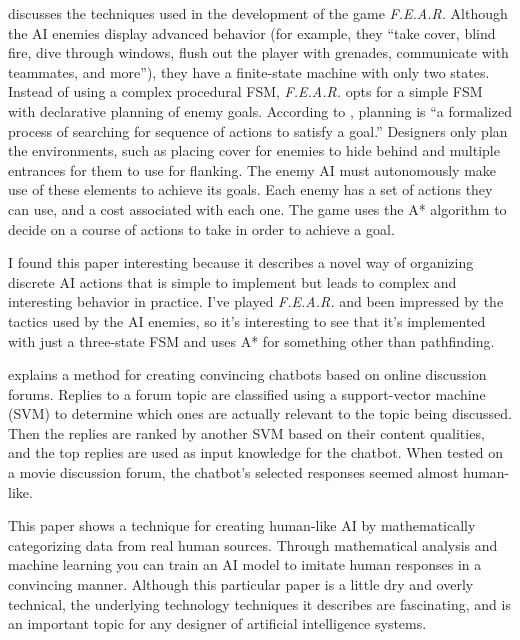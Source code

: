 \documentclass[a4paper, 10pt, american]{article}
\begin{document}
\cite{orkin2006three} discusses the techniques used in the development of the
game \textit{F.E.A.R.} Although the AI enemies display advanced behavior (for
example, they ``take cover, blind fire, dive through windows, flush out the
player with grenades, communicate with teammates, and more''), they have a
finite-state machine with only two states. Instead of using a complex procedural
FSM, \textit{F.E.A.R.} opts for a simple FSM with declarative planning of enemy
goals. According to \citeauthor{orkin2006three}, planning is ``a formalized
process of searching for sequence of actions to satisfy a goal.'' Designers only
plan the environments, such as placing cover for enemies to hide behind and
multiple entrances for them to use for flanking. The enemy AI must autonomously
make use of these elements to achieve its goals. Each enemy has a set of actions
they can use, and a cost associated with each one. The game uses the A*
algorithm to decide on a course of actions to take in order to achieve a goal.

I found this paper interesting because it describes a novel way of organizing
discrete AI actions that is simple to implement but leads to complex and
interesting behavior in practice. I've played \textit{F.E.A.R.} and been
impressed by the tactics used by the AI enemies, so it's interesting to see that
it's implemented with just a three-state FSM and uses A* for something other
than pathfinding.

\vspace{10pt}

\cite{huang2007extracting} explains a method for creating convincing chatbots
based on online discussion forums. Replies to a forum topic are classified using
a support-vector machine (SVM) to determine which ones are actually relevant to
the topic being discussed. Then the replies are ranked by another SVM based on
their content qualities, and the top replies are used as input knowledge for the
chatbot. When tested on a movie discussion forum, the chatbot's selected
responses seemed almost human-like.

This paper shows a technique for creating human-like AI by mathematically
categorizing data from real human sources. Through mathematical analysis and
machine learning you can train an AI model to imitate human responses in a
convincing manner. Although this particular paper is a little dry and overly
technical, the underlying technology techniques it describes are fascinating,
and is an important topic for any designer of artificial intelligence systems.
\end{document}

